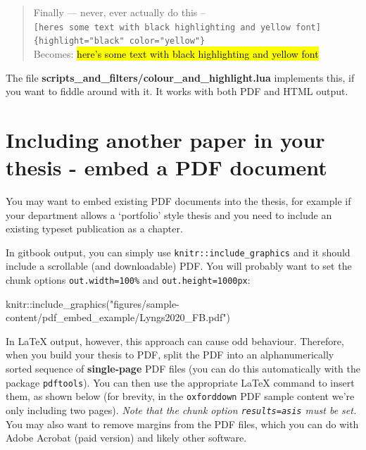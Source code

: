 \documentclass[a4paper, nobind]{templates/ociamthesis}
\newenvironment{Shaded}{\begin{snugshade}}{\end{snugshade}}
\newcommand{\FunctionTok}[1]{\textcolor[rgb]{0.00,0.00,0.00}{#1}}
\newcommand{\NormalTok}[1]{#1}
\newcommand{\SpecialCharTok}[1]{\textcolor[rgb]{0.00,0.00,0.00}{#1}}
\newcommand{\StringTok}[1]{\textcolor[rgb]{0.31,0.60,0.02}{#1}}
\renewenvironment{Shaded}
{
  \vspace{10pt}%
  \begin{snugshade}%
}{%
  \end{snugshade}%
  \vspace{8pt}%
}
\begin{document}
\begin{quote}
Finally --- never, ever actually do this -- \texttt{{[}here\textquotesingle{}s\ some\ text\ with\ black\ highlighting\ and\ yellow\ font{]}\{highlight="black"\ color="yellow"\}}\\
Becomes: \textcolor{yellow}{\hl{here's some text with black highlighting and yellow font}}
\end{quote}

The file \textbf{scripts\_and\_filters/colour\_and\_highlight.lua} implements this, if you want to fiddle around with it.
It works with both PDF and HTML output.

\hypertarget{embed-pdf}{%
\section{Including another paper in your thesis - embed a PDF document}\label{embed-pdf}}

You may want to embed existing PDF documents into the thesis, for example if your department allows a `portfolio' style thesis and you need to include an existing typeset publication as a chapter.

In gitbook output, you can simply use \texttt{knitr::include\_graphics} and it should include a scrollable (and downloadable) PDF.
You will probably want to set the chunk options \texttt{out.width=\textquotesingle{}100\%\textquotesingle{}} and \texttt{out.height=\textquotesingle{}1000px\textquotesingle{}}:

\begin{Shaded}
\begin{Highlighting}[]
\NormalTok{knitr}\SpecialCharTok{::}\FunctionTok{include\_graphics}\NormalTok{(}\StringTok{"figures/sample{-}content/pdf\_embed\_example/Lyngs2020\_FB.pdf"}\NormalTok{)}
\end{Highlighting}
\end{Shaded}

In LaTeX output, however, this approach can cause odd behaviour.
Therefore, when you build your thesis to PDF, split the PDF into an alphanumerically sorted sequence of \textbf{single-page} PDF files (you can do this automatically with the package \texttt{pdftools}). You can then use the appropriate LaTeX command to insert them, as shown below (for brevity, in the \texttt{oxforddown} PDF sample content we're only including two pages).
\emph{Note that the chunk option \texttt{results=\textquotesingle{}asis\textquotesingle{}} must be set.}
You may also want to remove margins from the PDF files, which you can do with Adobe Acrobat (paid version) and likely other software.
\end{document}
